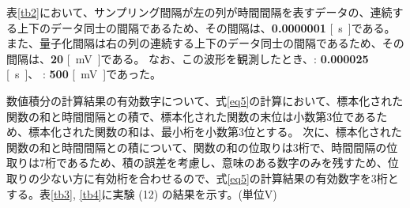   表\ref{tb2}において、サンプリング間隔が左の列が時間間隔を表すデータの、連続する上下のデータ同士の間隔であるため、その間隔は、\textbf{0.0000001} \si{[s]}である。
また、量子化間隔は右の列の連続する上下のデータ同士の間隔であるため、その間隔は、\textbf{20} \si{[mV]}である。
なお、この波形を観測したとき、\textbf{}: \textbf{0.000025} \si{[s]}、 \textbf{}: \textbf{500} \si{[mV]}であった。


  数値積分の計算結果の有効数字について、式\eqref{eq5}の計算において、標本化された関数の和と時間間隔との積で、標本化された関数の末位は小数第3位であるため、標本化された関数の和は、最小桁を小数第3位とする。
  次に、標本化された関数の和と時間間隔との積について、関数の和の位取りは3桁で、時間間隔の位取りは7桁であるため、積の誤差を考慮し、意味のある数字のみを残すため、位取りの少ない方に有効桁を合わせるので、式\eqref{eq5}の計算結果の有効数字を3桁とする。表\ref{tb3}, \ref{tb4}に実験 (12) の結果を示す。(単位\si{V})
  
